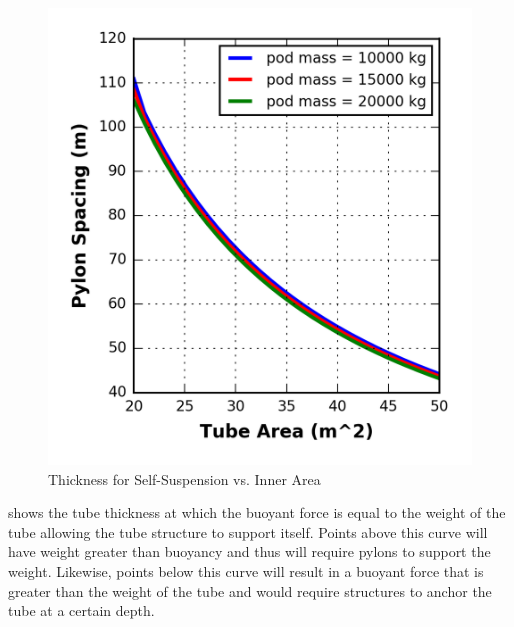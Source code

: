 \begin{figure}
	\centering
	\includegraphics{../../images/graphs/overland_structural_trades/pylon_spacing_vs_tube_area.png}
	\caption{Thickness for Self-Suspension vs. Inner Area}
	\label{fig:thick_susp_vs_area}
\end{figure}

 shows the tube thickness at which the buoyant force is equal to the weight of the tube allowing the tube structure to support itself. Points above this curve will have weight greater than buoyancy and thus will require pylons to support the weight. Likewise, points below this curve will result in a buoyant force that is greater than the weight of the tube and would require structures to anchor the tube at a certain depth.

